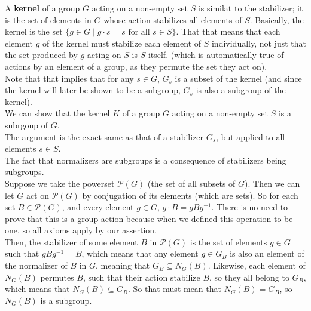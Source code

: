 \documentclass[12pt]{article}
\begin{document}
    A \textbf{kernel} of a group $G$ acting on a non-empty set $S$
    is similat to the stabilizer;
    it is the set of elements in $G$ whose action stabilizes
    all elements of $S$.
    Basically, the kernel is the set
    $\{ g \in G \mid g \cdot s = s \text{ for all } s \in S \}$.
    That that means that each element $g$ of the kernel
    must stabilize each element of $S$ individually,
    not just that the set produced by $g$ acting on $S$ is $S$ itself.
    (which is automatically true of actions by an element of a group,
    as they permute the set they act on). \\
    Note that that implies that for any $s \in G$,
    $G_s$ is a subset of the kernel
    (and since the kernel will later be shown to be a subgroup,
    $G_s$ is also a subgroup of the kernel). \\

    We can show that the kernel $K$ of a group $G$ acting on
    a non-empty set $S$ is a subrgoup of $G$. \\
    The argument is the exact same as that of a stabilizer $G_s$,
    but applied to all elements $s \in S$. \\

    The fact that normalizers are subgroups
    is a consequence of stabilizers being subgroups. \\
    Suppose we take the powerset $\mathcal{P}(G)$
    (the set of all subsets of $G$).
    Then we can let $G$ act on $\mathcal{P}(G)$
    by conjugation of its elements (which are sets).
    So for each set $B \in \mathcal{P}(G)$,
    and every element $g \in G$,
    $g \cdot B = gBg^{-1}$.
    There is no need to prove that this is a group action
    because when we defined this operation to be one,
    so all axioms apply by our assertion. \\
    Then, the stabilizer of some element $B$ in $\mathcal{P}(G)$
    is the set of elements $g \in G$ 
    such that $gBg^{-1} = B$,
    which means that any element $g \in G_B$ 
    is also an element of the normalizer of $B$ in $G$,
    meaning that $G_B \subseteq N_G(B)$.
    Likewise, each element of $N_G(B)$ permutes $B$,
    such that their action stabilize $B$,
    so they all belong to $G_B$,
    which means that $N_G(B) \subseteq G_B$.
    So that must mean that $N_G(B) = G_B$,
    so $N_G(B)$ is a subgroup. \\
\end{document}
